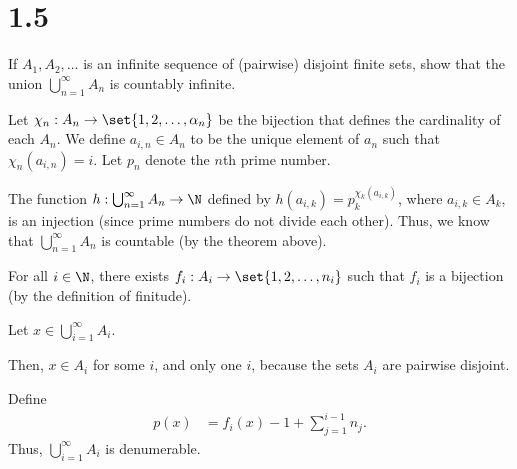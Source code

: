 \documentclass[10pt]{mypackage}
\begin{document}
\section{1.5}%
\begin{problem}
  If $A_1,A_2,\dots$ is an infinite sequence of (pairwise) disjoint finite sets, show that the union $\bigcup_{n=1}^{\infty}A_n$ is countably infinite.
\end{problem}
\begin{solution}
  Let $\chi_n: A_n \rightarrow \set{1,2,\dots,\alpha_n}$ be the bijection that defines the cardinality of each $A_n$. We define $a_{i,n}\in A_n$ to be the unique element of $a_n$ such that $\chi_{n}\left(a_{i,n}\right) = i$. Let $p_n$ denote the $n$th prime number.\newline

  The function $h: \bigcup_{n=1}^{\infty}A_n \rightarrow \N$ defined by $h\left(a_{i,k}\right) = p_k^{\chi_{k}\left(a_{i,k}\right)}$, where $a_{i,k}\in A_k$, is an injection (since prime numbers do not divide each other). Thus, we know that $\bigcup_{n=1}^{\infty}A_n$ is countable (by the theorem above).
\end{solution}
{\color{blue}
\begin{solution}[Proposed]
  For all $i\in \N$, there exists $f_i: A_i \rightarrow \set{1,2,\dots,n_i}$ such that $f_i$ is a bijection (by the definition of finitude).\newline

  Let $x\in \bigcup_{i=1}^{\infty}A_i$.\newline

  Then, $x\in A_i$ for some $i$, and only one $i$, because the sets $A_i$ are pairwise disjoint.\newline

  Define
  \begin{align*}
    p(x) &= f_i(x) - 1 + \sum_{j=1}^{i-1}n_j.
  \end{align*}
  Thus, $\bigcup_{i=1}^{\infty}A_i$ is denumerable.
\end{solution}
}
\end{document}
